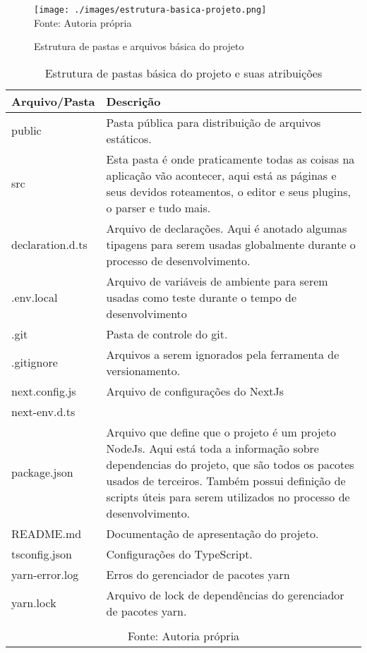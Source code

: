 \begin{figure}[H]
    \centering
    \caption{Estrutura de pastas e arquivos básica do projeto}
    \texttt{[image: ./images/estrutura-basica-projeto.png]}
    \label{fig:estrutura-basica-projeto} \\
    \textnormal{\fontsize{10pt}{12pt}Fonte: Autoria própria}
\end{figure}

\begin{table}[H]
    \centering
    \caption{Estrutura de pastas básica do projeto e suas atribuições}
    \label{tbl:pastas-projeto}
    \renewcommand{\arraystretch}{1.5}
    \begin{tabular}{p{3.2cm} p{12.8cm}}
        \hline
        \textbf{Arquivo/Pasta} & \textbf{Descrição} \\
        \hline
        public & Pasta pública para distribuição de arquivos estáticos. \\
		src & Esta pasta é onde praticamente todas as coisas na aplicação vão acontecer,
            aqui está as páginas e seus devidos roteamentos, o editor e seus plugins,
            o parser e tudo mais.
         \\
		declaration.d.ts & Arquivo de declarações. Aqui é anotado algumas tipagens para serem usadas
            globalmente durante o processo de desenvolvimento.
         \\
		.env.local & Arquivo de variáveis de ambiente para serem usadas como teste durante                o tempo de desenvolvimento \\
		.git & Pasta de controle do git. \\
		.gitignore & Arquivos a serem ignorados pela ferramenta de versionamento. \\
		next.config.js & Arquivo de configurações do NextJs \\
		next-env.d.ts &  \\
		package.json & Arquivo que define que o projeto é um projeto NodeJs. Aqui está toda a informação sobre dependencias
            do projeto, que são todos os pacotes usados de terceiros. Também possui definição
            de scripts úteis para serem utilizados no processo de desenvolvimento.
         \\
		README.md & Documentação de apresentação do projeto. \\
		tsconfig.json & Configurações do TypeScript. \\
		yarn-error.log & Erros do gerenciador de pacotes yarn \\
		yarn.lock & Arquivo de lock de dependências do gerenciador de pacotes yarn. \\
        \hline
        \\\multicolumn{2}{c}{\fontsize{10pt}{12pt}Fonte: Autoria própria}
    \end{tabular}
\end{table}


